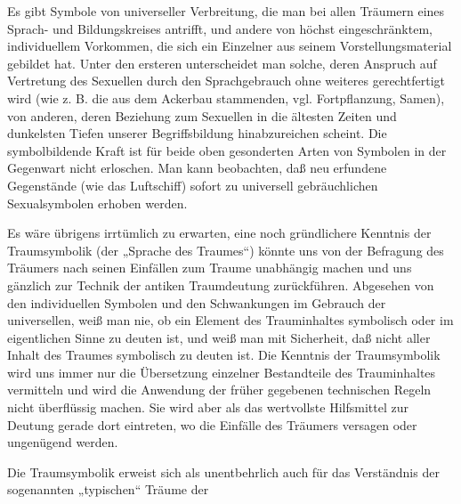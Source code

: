 \documentclass[twoside=true,titlepage=false,open=any, parskip=never, fontsize=10pt, headings=small, chapterprefix=false, appendixprefix=false]{scrbook}
\begin{document}
         
            
            
            
        \pstart
        Es gibt Symbole von universeller Verbreitung, die man bei allen Träumern eines
               Sprach- und Bildungskreises antrifft, und andere von höchst eingeschränktem,
               individuellem Vorkommen, die sich ein Einzelner aus seinem Vorstellungsmaterial
               gebildet hat. Unter den ersteren unterscheidet man solche, deren Anspruch
               auf Vertretung des Sexuellen durch den Sprachgebrauch ohne weiteres
               gerechtfertigt wird (wie z. B. die aus dem Ackerbau stammenden, vgl.
               Fortpflanzung, Samen), von anderen, deren Beziehung zum Sexuellen in die
               ältesten Zeiten und dunkelsten Tiefen unserer Begriffsbildung hinabzureichen
               scheint. Die symbolbildende Kraft ist für beide oben gesonderten Arten von
               Symbolen in der Gegenwart nicht erloschen. Man kann beobachten, daß neu
               erfundene Gegenstände (wie das Luftschiff) sofort zu universell gebräuchlichen
               Sexualsymbolen erhoben werden.
        \pend
    
            
        \pstart
        Es wäre übrigens irrtümlich zu erwarten, eine noch gründlichere
               Kenntnis der Traumsymbolik (der „Sprache des Traumes“) könnte uns von der
               Befragung des Träumers nach seinen Einfällen zum Traume unabhängig
               machen und uns gänzlich zur Technik der antiken Traumdeutung zurückführen.
               Abgesehen von den individuellen Symbolen und den Schwankungen im Gebrauch
               der universellen, weiß man nie, ob ein Element des Trauminhaltes symbolisch oder
               im eigentlichen Sinne zu deuten ist, und weiß man mit Sicherheit, daß nicht
               aller Inhalt des Traumes symbolisch zu deuten ist. Die Kenntnis der Traumsymbolik wird uns immer nur die Übersetzung einzelner
               Bestandteile des Trauminhaltes vermitteln und wird die Anwendung der
               früher gegebenen technischen Regeln nicht überflüssig machen. Sie wird aber als
               das wertvollste Hilfsmittel zur Deutung gerade dort eintreten, wo die Einfälle
               des Träumers versagen oder ungenügend werden.
        \pend
    
            
        \pstart
        Die Traumsymbolik erweist sich als unentbehrlich auch für das Verständnis der
               sogenannten „typischen“ Träume der
        \pend
    
\end{document}
